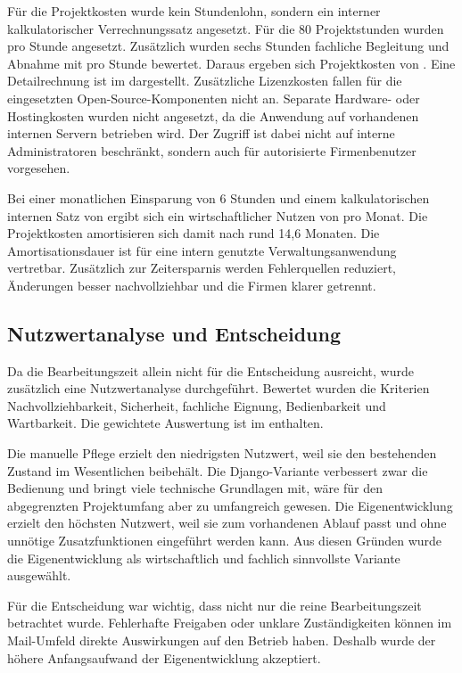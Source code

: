 Für die Projektkosten wurde kein Stundenlohn, sondern ein interner
kalkulatorischer Verrechnungssatz angesetzt. Für die 80 Projektstunden wurden
 pro Stunde angesetzt. Zusätzlich wurden sechs Stunden fachliche
Begleitung und Abnahme mit  pro Stunde bewertet. Daraus ergeben sich
Projektkosten von . Eine Detailrechnung ist im 
dargestellt. Zusätzliche Lizenzkosten fallen für die eingesetzten
Open-Source-Komponenten nicht an. Separate Hardware- oder Hostingkosten wurden
nicht angesetzt, da die Anwendung auf vorhandenen internen Servern betrieben
wird. Der Zugriff ist dabei nicht auf interne Administratoren beschränkt,
sondern auch für autorisierte Firmenbenutzer vorgesehen.

Bei einer monatlichen Einsparung von 6 Stunden und einem kalkulatorischen
internen Satz von  ergibt sich ein wirtschaftlicher Nutzen von
 pro Monat. Die Projektkosten amortisieren sich damit nach rund
14{,}6 Monaten. Die Amortisationsdauer ist für eine intern genutzte
Verwaltungsanwendung vertretbar. Zusätzlich zur Zeitersparnis werden
Fehlerquellen reduziert, Änderungen besser nachvollziehbar und die
Firmen klarer getrennt.

\subsection{Nutzwertanalyse und Entscheidung}
\label{sec:Nutzwertanalyse}
Da die Bearbeitungszeit allein nicht für die Entscheidung ausreicht, wurde
zusätzlich eine Nutzwertanalyse durchgeführt. Bewertet wurden die Kriterien
Nachvollziehbarkeit, Sicherheit, fachliche Eignung, Bedienbarkeit und
Wartbarkeit. Die gewichtete Auswertung ist im
 enthalten.

Die manuelle Pflege erzielt den niedrigsten Nutzwert, weil sie den bestehenden
Zustand im Wesentlichen beibehält. Die Django-Variante verbessert zwar die
Bedienung und bringt viele technische Grundlagen mit, wäre für den abgegrenzten
Projektumfang aber zu umfangreich gewesen. Die Eigenentwicklung erzielt den
höchsten Nutzwert, weil sie zum vorhandenen Ablauf passt und ohne unnötige
Zusatzfunktionen eingeführt werden kann.
Aus diesen Gründen wurde die Eigenentwicklung als wirtschaftlich und fachlich
sinnvollste Variante ausgewählt.

Für die Entscheidung war wichtig, dass nicht nur die reine Bearbeitungszeit
betrachtet wurde. Fehlerhafte Freigaben oder unklare Zuständigkeiten können im
Mail-Umfeld direkte Auswirkungen auf den Betrieb haben. Deshalb wurde der
höhere Anfangsaufwand der Eigenentwicklung akzeptiert.
